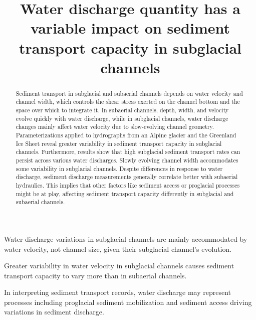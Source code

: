 \documentclass[draft]{agujournal2019}
\begin{document}
\title{Water discharge quantity has a variable impact on sediment transport capacity in subglacial channels}


  


\begin{keypoints}
\item Water discharge variations in subglacial channels are mainly accommodated by water velocity, not channel size, given their subglacial channel's evolution.
\item Greater variability in water velocity in subglacial channels causes sediment transport capacity to vary more than in subaerial channels.
\item In interpreting sediment transport records, water discharge may represent processes including proglacial sediment mobilization and sediment access driving variations in sediment discharge.
\end{keypoints}

\begin{abstract}
  Sediment transport in subglacial and subaerial channels depends on  water velocity and channel width, which controls the shear stress exerted on the channel bottom and the space over which to integrate it.
  In subaerial channels, depth, width, and velocity evolve quickly with water discharge, while in subglacial channels, water discharge changes mainly affect water velocity due to slow-evolving channel geometry.
  Parameterizations applied to hydrographs from an Alpine glacier and the Greenland Ice Sheet reveal greater variability in sediment transport capacity in subglacial channels.
  Furthermore, results show that high subglacial sediment transport rates can persist across various water discharges.
  Slowly evolving channel width accommodates some variability in subglacial channels.
  Despite differences in response to water discharge, sediment discharge measurements generally correlate better with subaerial hydraulics.
  This implies that other factors like sediment access or proglacial processes might be at play, affecting sediment transport capacity differently in subglacial and subaerial channels.
\end{abstract}
\end{document}
